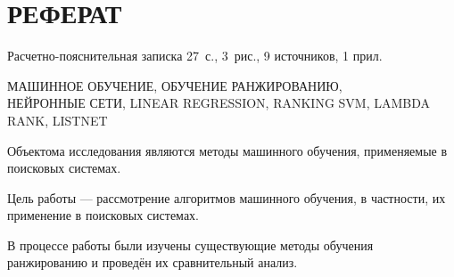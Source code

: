 \chapter*{РЕФЕРАТ}

Расчетно-пояснительная записка 27~с., 3~рис., 9 источников, 1 прил.

\noindent\MakeUppercase{машинное обучение, обучение ранжированию,\\нейронные сети, linear regression, ranking svm, lambda rank, listnet}


Объектома  исследования являются методы машинного обучения, применяемые в поисковых системах.

Цель работы --- рассмотрение алгоритмов машинного обучения, в частности, их применение в поисковых системах.

В процессе работы были изучены существующие методы обучения ранжированию и проведён их сравнительный анализ.

\setcounter{page}{3}